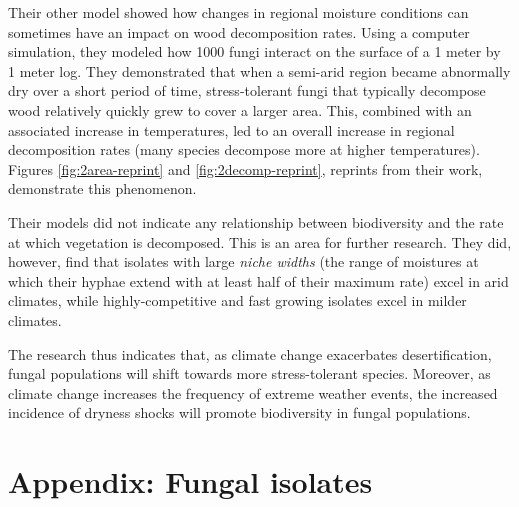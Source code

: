 \documentclass[12pt]{article}
\begin{document}
Their other model showed how changes in regional moisture conditions can sometimes have an impact on wood decomposition rates. Using a computer simulation, they modeled how 1000 fungi interact on the surface of a 1 meter by 1 meter log. They demonstrated that when a semi-arid region became abnormally dry over a short period of time, stress-tolerant fungi that typically decompose wood relatively quickly grew to cover a larger area. This, combined with an associated increase in temperatures, led to an overall increase in regional decomposition rates (many species decompose more at higher temperatures). Figures \ref{fig:2area-reprint} and \ref{fig:2decomp-reprint}, reprints from their work, demonstrate this phenomenon.

Their models did not indicate any relationship between biodiversity and the rate at which vegetation is decomposed. This is an area for further research. They did, however, find that isolates with large \textit{niche widths} (the range of moistures at which their hyphae extend with at least half of their maximum rate) excel in arid climates, while highly-competitive and fast growing isolates excel in milder climates.

The research thus indicates that, as climate change exacerbates desertification, fungal populations will shift towards more stress-tolerant species. Moreover, as climate change increases the frequency of extreme weather events, the increased incidence of dryness shocks will promote biodiversity in fungal populations. 





\newpage
\appendix 
\section{Appendix: Fungal isolates}
\end{document}
